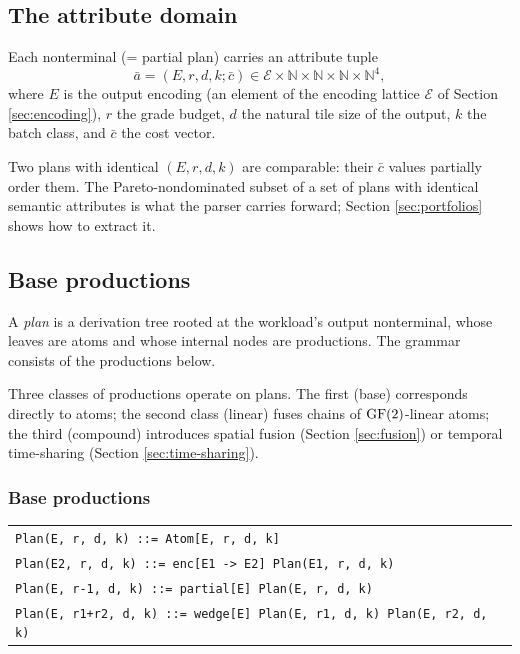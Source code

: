 \subsection{The attribute domain}\label{sec:attributes}

Each nonterminal (= partial plan) carries an attribute
tuple
\begin{equation}
  \bar{a} = (E, r, d, k; \bar{c}) \in
  \mathcal{E} \times \mathbb{N} \times \mathbb{N}
  \times \mathbb{N} \times \mathbb{N}^4,
\end{equation}
where $E$ is the output encoding (an element of the
encoding lattice $\mathcal{E}$ of
Section \ref{sec:encoding}), $r$ the grade budget, $d$
the natural tile size of the output, $k$ the batch
class, and $\bar{c}$ the cost vector.

Two plans with identical $(E, r, d, k)$ are
comparable: their $\bar{c}$ values partially order
them. The Pareto-nondominated subset of a set of
plans with identical semantic attributes is what the
parser carries forward; Section \ref{sec:portfolios}
shows how to extract it.

\subsection{Base productions}\label{sec:productions}

\begin{definition}[Plan]\label{def:plan}
  A \emph{plan} is a derivation tree rooted at the
  workload's output nonterminal, whose leaves are
  atoms and whose internal nodes are productions. The
  grammar consists of the productions below.
\end{definition}

Three classes of productions operate on plans. The
first (base) corresponds directly to atoms; the second
class (linear) fuses chains of $\operatorname{GF}(2)$-linear atoms;
the third (compound) introduces spatial fusion
(Section \ref{sec:fusion}) or temporal time-sharing
(Section \ref{sec:time-sharing}).

\subsubsection*{Base productions}

\begin{center}
\small
\begin{tabular}{l}
\verb|Plan(E, r, d, k) ::= Atom[E, r, d, k]|\\[2pt]
\verb|Plan(E2, r, d, k) ::= enc[E1 -> E2] Plan(E1, r, d, k)|\\[2pt]
\verb|Plan(E, r-1, d, k) ::= partial[E] Plan(E, r, d, k)|\\[2pt]
\verb|Plan(E, r1+r2, d, k) ::= wedge[E] Plan(E, r1, d, k) Plan(E, r2, d, k)|
\end{tabular}
\end{center}

